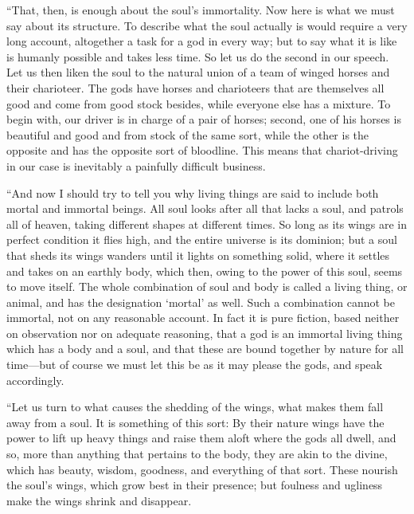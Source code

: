 “That, then, is enough about the soul's immortality. Now
here is what we must say about its structure. To describe what the soul
actually is would require a very long account, altogether a task for a
god in every way; but to say what it is like is humanly possible and
takes less time. So let us do the second in our speech. Let us then
liken the soul to the natural union of a team of winged horses and their
charioteer. The gods have horses and charioteers that are themselves all
good and come from good stock besides, while everyone else has a
mixture. To begin with, our driver is in charge of a pair of horses;
second, one of his horses is beautiful and good and from stock of the
same sort, while the other is the opposite and has the opposite sort of
bloodline. This means that chariot-driving in our case is inevitably a
painfully difficult business.

“And now I should try to tell you why living things are said to include
both mortal and immortal beings. All soul looks after all that lacks a
soul, and patrols all of heaven, taking different shapes at
different times. So long as its wings are in perfect condition it flies
high, and the entire universe is its dominion; but a soul that sheds its
wings wanders until it lights on something solid, where it settles and
takes on an earthly body, which then, owing to the power of this soul,
seems to move itself. The whole combination of soul and body is called a
living thing, or animal, and has the designation ‘mortal' as well. Such
a combination cannot be immortal, not on any reasonable account. In fact
it is pure fiction, based neither on observation nor on adequate
reasoning, that a god is an immortal living thing which has a body and a
soul, and that these are bound together by nature for all time---but of
course we must let this be as it may please the gods, and speak
accordingly.

“Let us turn to what causes the shedding of the wings, what makes them
fall away from a soul. It is something of this sort: By their nature
wings have the power to lift up heavy things and raise them aloft where
the gods all dwell, and so, more than anything that pertains to the
body, they are akin to the divine, which has beauty, wisdom, goodness,
and everything of that sort. These nourish the soul's wings,
which grow best in their presence; but foulness and ugliness make the
wings shrink and disappear.

